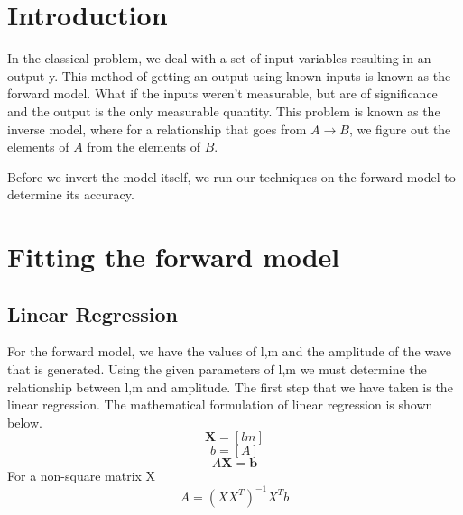 \section{Introduction}
In the classical problem, we deal with a set of input variables resulting in an output y. This method of getting an output using known inputs is known as the forward model. What if the inputs weren't measurable, but are of significance and the output is the only measurable quantity. This problem is known as the inverse model, where for a relationship that goes from $A \longrightarrow B$, we figure out the elements of $A$ from the elements of $B$. 

Before we invert the model itself, we run our techniques on the forward model to determine its accuracy.  
\section{Fitting the forward model}
\subsection{Linear Regression}
For the forward model, we have the values of l,m and the amplitude of the wave that is generated. Using the given parameters of l,m we must determine the relationship between l,m and amplitude. The first step that we have taken is the linear regression. The mathematical formulation of linear regression is shown below.
$$\textbf{X} = [l m]$$
$$b = [A]$$
\begin{equation}
A\textbf{X} = \textbf{b}
\end{equation}
For a non-square matrix X
\begin{equation}
A = (XX^T)^{-1}X^Tb
\end{equation}

